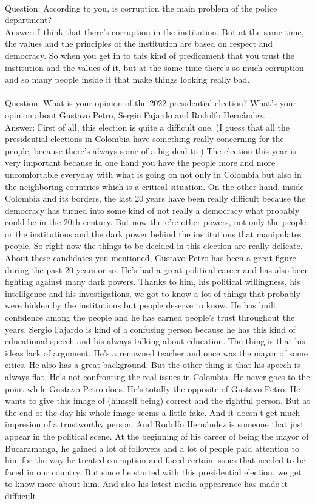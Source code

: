 \documentclass{phyasgn}\usepackage{nag}
\begin{document}
\\
Question: According to you, is corruption the main problem of the police department?\\
Answer: I think that there’s corruption in the institution. But at the same time, the values and the principles of the institution are based on respect and democracy. So when you get in to this kind of predicament that you trust the institution and the values of it, but at the same time there’s so much corruption and so many people inside it that make things looking really bad.\\
\\
Question: What is your opinion of the 2022 presidential election? What’s your opinion about Gustavo Petro, Sergio Fajardo and Rodolfo Hernández.\\
Answer: First of all, this election is quite a difficult one. (I guess that all the presidential elections in Colombia have something really concerning for the people, because there’s always some of a big deal to ) The election this year is very important because in one hand you have the people more and more uncomfortable everyday with what is going on not only in Colombia but also in the neighboring countries which is a critical situation. On the other hand, inside Colombia and its borders, the last 20 years have been really difficult because the democracy has turned into some kind of not really a democracy what probably could be in the 20th century. But now there’re other powers, not only the people or the institutions and the dark power behind the institutions that manipulates people. So right now the things to be decided in this election are really delicate. About these candidates you mentioned, Gustavo Petro has been a great figure during the past 20 years or so. He’s had a great political career and has also been fighting against many dark powers. Thanks to him, his political willingness, his intelligence and his investigations, we got to know a lot of things that probably were hidden by the institutions but people deserve to know. He has built confidence among the people and he has earned people’s trust throughout the years. Sergio Fajardo is kind of a confusing person because he has this kind of educational speech and his always talking about education. The thing is that his ideas lack of argument. He’s a renowned teacher and once was the mayor of some cities. He also has a great background. But the other thing is that his speech is always flat. He’s not confronting the real issues in Colombia. He never goes to the point while Gustavo Petro does. He’s totally the opposite of Gustavo Petro. He wants to give this image of (himself being) correct and the rightful person. But at the end of the day his whole image seems a little fake. And it doesn’t get much impresion of a trustworthy person. And Rodolfo Hernández is someone that just appear in the political scene. At the beginning of his career of being the mayor of Bucaramanga, he gained a lot of followers and a lot of people paid attention to him for the way he treated corruption and faced certain issues that needed to be faced in our country. But since he started with this presidential election, we get to know more about him. And also his latest media appearance has made it diffucult 
\end{document}
